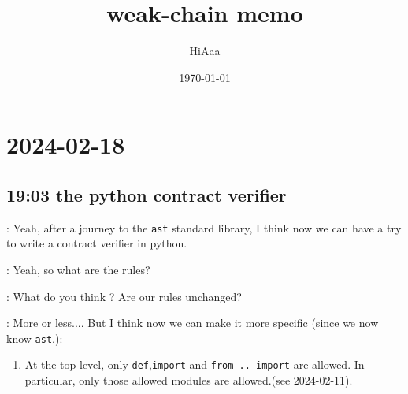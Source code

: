 \documentclass[dvipsnames]{article}
\title{weak-chain memo}
\date{\today}
\author{HiAaa}
\begin{document}
\maketitle
\tableofcontents{}
\newpage{}

% 
% 
% 

\section*{2024-02-18}
\subsection*{19:03 the python contract verifier}

 : Yeah, after a journey to the \texttt{ast} standard library, I
think now we can have a try to write a contract verifier in python.

 : Yeah, so what are the rules?

 : What do you think ? Are our rules unchanged?

 : More or less.... But I think now we can make it more
specific (since we now know \texttt{ast}.):

\begin{enumerate}
\item At the top level, only \texttt{def},\texttt{import} and \texttt{from .. import}
  are allowed. In particular, only those allowed modules are allowed.(see
  2024-02-11).
\end{enumerate}
\end{document}
